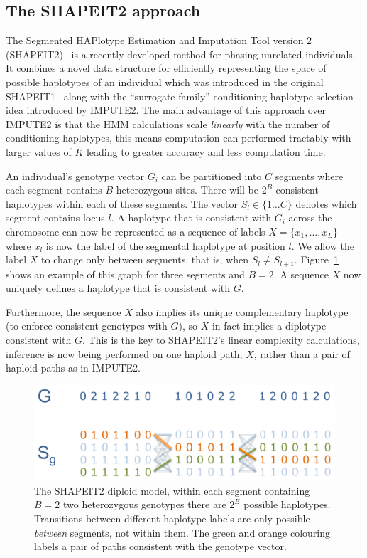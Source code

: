 \subsection{The SHAPEIT2 approach}
The Segmented HAPlotype Estimation and Imputation Tool version 2 (SHAPEIT2)~\citep{delaneau2013} is a recently developed method for phasing unrelated individuals. It combines a novel data structure for efficiently representing the space of possible  haplotypes of an individual which was introduced in the original SHAPEIT1~\citep{delaneau2011linear} along with the ``surrogate-family'' conditioning haplotype selection idea introduced by IMPUTE2. The main advantage of this approach over IMPUTE2 is that the HMM calculations  scale \emph{linearly} with the number of conditioning haplotypes, this means computation can performed tractably with larger values of $K$ leading to greater accuracy and less computation time.

An individual's genotype vector $G_i$ can be partitioned into $C$ segments where each segment contains $B$ heterozygous sites.  There will be $2^B$ consistent haplotypes within each of these segments.  The vector $S_l \in \{1\ldots C\}$ denotes which segment contains locus $l$. A haplotype that is consistent with $G_i$ across the chromosome can now be represented as a sequence of labels $X = \{x_1,\ldots,x_L\}$  where $x_l$ is now the label of the segmental haplotype at position $l$.  We allow the label $X$ to change only between segments, that is, when $S_l\neq S_{l+1}$.  Figure~\ref{chap3:s2seg} shows an example of this graph for three segments and $B=2$. A sequence $X$ now uniquely defines a haplotype that is consistent with $G$. 

Furthermore, the sequence $X$ also implies its unique complementary haplotype (to enforce consistent genotypes with $G$), so $X$ in fact implies a diplotype consistent with $G$.  This is the key to SHAPEIT2's linear complexity calculations, inference is now being performed on one haploid path, $X$, rather than a pair of haploid paths as in IMPUTE2.

\begin{figure}
  \begin{center} 
    \includegraphics[width=\textwidth]{chap3figs/shapeit_model}
    \caption[The SHAPEIT2 diploid model]{The SHAPEIT2 diploid model, within each segment containing $B=2$ two heterozygous genotypes there are $2^B$ possible haplotypes.  Transitions between different haplotype labels are only possible \emph{between} segments, not within them.  The green and orange colouring labels a pair of paths consistent with the genotype vector.\label{chap3:s2seg}}
  \end{center} 
\end{figure}

